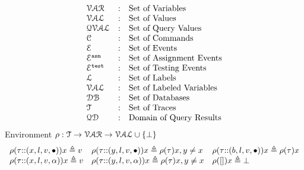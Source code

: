 \[
\begin{array}{lll}
\mathcal{VAR} & : & \mbox{Set of Variables}  
\\ 
%
\mathcal{VAL} & : & \mbox{Set of Values} 
\\ 
%
\mathcal{QVAL} & : & \mbox{Set of Query Values} 
\\ 
%
\cdom & : & \mbox{Set of Commands} 
\\ 
%
\eventset  & : & \mbox{Set of Events}  
\\
%
\eventset^{\asn}  & : & \mbox{Set of Assignment Events}  
\\
%
\eventset^{\test}  & : & \mbox{Set of Testing Events}  
\\
%
\ldom  & : & \mbox{Set of Labels}  
\\
\mathcal{VAL}  & : & \mbox{Set of Labeled Variables}  
\\
\dbdom  & : & \mbox{{Set of Databases}} 
\\
%
{\mathcal{T}} & : & \mbox{Set of Traces}
\\
%
\qdom & : & \mbox{{Domain of Query Results}}\\
\end{array}
\]
%
%
%
Environment $ \rho : {\mathcal{T}}  \to \mathcal{VAR} \to \mathcal{VAL} \cup \{\bot\}$
\[
\begin{array}{lll}
\rho(\mathtt{\tau}  {\small ::} (x, l, v, \bullet)) x \triangleq v
&
\rho(\mathtt{\tau} {\small ::} (y, l, v, \bullet)) x \triangleq \rho(\mathtt{\tau}) x, y \neq x
&
\rho(\mathtt{\tau} {\small ::} (b, l, v, \bullet)) x \triangleq \rho(\mathtt{\tau}) x
\\
\rho(\mathtt{\tau} {\small ::} (x, l, v, \alpha)) x \triangleq v
&
\rho(\mathtt{\tau} {\small ::} (y, l, v, \alpha)) x \triangleq \rho(\mathtt{\tau}) x, y \neq x
&
\rho({[]} ) x \triangleq \bot
\end{array}
\]
%
%
%

